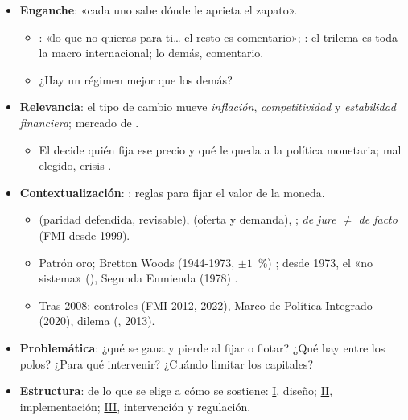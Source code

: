 \documentclass{article}
\begin{document}
\cabecerarepaso
\begin{columnas}

\begin{itemize}
\item \textbf{Enganche}: «cada uno sabe dónde le aprieta el zapato».
  \begin{itemize}
  \item {}: «lo que no quieras para ti… el resto es comentario»; : el trilema es toda la macro internacional; lo demás, comentario.
  \item ¿Hay un régimen mejor que los demás?
  \end{itemize}
\item \textbf{Relevancia}: el tipo de cambio mueve \emph{inflación}, \emph{competitividad} y \emph{estabilidad financiera}; mercado de  .
  \begin{itemize}
  \item El  decide quién fija ese precio y qué le queda a la política monetaria; mal elegido, crisis .
  \end{itemize}
\item \textbf{Contextualización}: : reglas para fijar el valor de la moneda.
  \begin{itemize}
  \item {} (paridad defendida, revisable),  (oferta y demanda), ; \emph{de jure} $\neq$ \emph{de facto} (FMI desde 1999).
  \item Patrón oro; Bretton Woods (1944-1973, $\pm1$~\%) ; desde 1973, el «no sistema» (), Segunda Enmienda (1978) .
  \item Tras 2008: controles (FMI 2012, 2022), Marco de Política Integrado (2020), dilema (, 2013).
  \end{itemize}
\item \textbf{Problemática}: ¿qué se gana y pierde al fijar o flotar? ¿Qué hay entre los polos? ¿Para qué intervenir? ¿Cuándo limitar los capitales?
\item \textbf{Estructura}: de lo que se elige a cómo se sostiene: \hyperref[rep:I]{I}, diseño; \hyperref[rep:II]{II}, implementación; \hyperref[rep:III]{III}, intervención y regulación.
\end{itemize}

\end{columnas}
\end{document}
